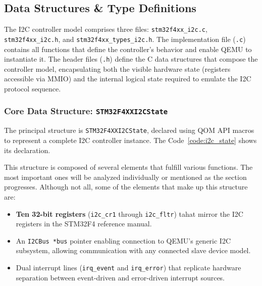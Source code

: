 \subsection{Data Structures \& Type Definitions}
\label{sec:impl_i2c_data_structures}

The I2C controller model comprises three files: \texttt{stm32f4xx\_i2c.c}, \\ \texttt{stm32f4xx\_i2c.h}, and \texttt{stm32f4xx\_types\_i2c.h}. The implementation 
file (\texttt{.c}) contains all functions that define the controller's behavior and 
enable QEMU to instantiate it. The header files (\texttt{.h}) define the C data 
structures that compose the controller model, encapsulating both the visible hardware 
state (registers accessible via MMIO) and the internal logical state required to 
emulate the I2C protocol sequence.

\subsubsection{Core Data Structure: \texttt{STM32F4XXI2CState}}

The principal structure is \texttt{STM32F4XXI2CState}, declared using QOM API macros 
to represent a complete I2C controller instance. The Code~\ref{code:i2c_state} shows 
its declaration.




This structure is composed of several elements that fulfill various functions. The most important ones will be analyzed individually or mentioned as the section progresses. Although not all, some of the elements that make up this structure are:

\begin{itemize}
    \item \textbf{Ten 32-bit registers} (\texttt{i2c\_cr1} through \texttt{i2c\_fltr}) 
    tahat mirror the I2C registers in the STM32F4 reference manual.
    
    \item An \texttt{I2CBus *bus} pointer enabling connection to QEMU's generic I2C 
    subsystem, allowing communication with any connected slave device model.
    
    \item Dual interrupt lines (\texttt{irq\_event} and \texttt{irq\_error}) that 
    replicate hardware separation between event-driven and error-driven interrupt 
    sources.
\end{itemize}

